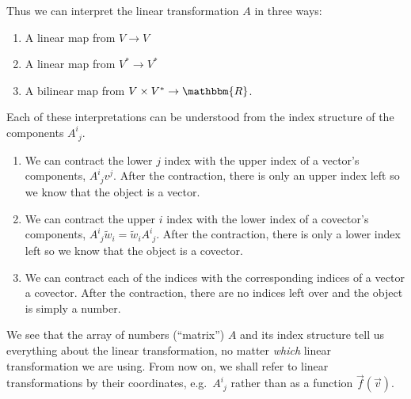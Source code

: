 \documentclass[
  11pt,
	colorful,
	raggedright,
]{tufte-style-thesis-flip}
\newcommand{\aij}[2]{^{#1}_{\phantom{#1}#2}}
\begin{document}
Thus we can interpret the linear transformation $A$ in three ways:
\begin{enumerate}
  \item A linear map from $V\to V$
  \item A linear map from $V^*\to V^*$
  \item A bilinear map from $V\times V^* \to \mathbbm{R}$.
\end{enumerate}
Each of these interpretations can be understood from the index structure of the components $A\aij{i}{j}$.
\begin{enumerate}
  \item We can contract the lower $j$ index with the upper index of a vector's components, $A\aij{i}{j}v^j$. After the contraction, there is only an upper index left so we know that the object is a vector. 
  \item We can contract the upper $i$ index with the lower index of a covector's components, $A\aij{i}{j}\tilde w_i= \tilde w_iA\aij{i}{j}$. After the contraction, there is only a lower index left so we know that the object is a covector. 
  \item We can contract each of the indices with the corresponding indices of a vector a covector. After the contraction, there are no indices left over and the object is simply a number.
\end{enumerate}

We see that the array of numbers (``matrix'') $A$ and its index structure tell us everything about the linear transformation, no matter \emph{which} linear transformation we are using. From now on, we shall refer to linear transformations by their coordinates, e.g.\ $A\aij{i}{j}$ rather than as a function $\vec{f}(\vec{v})$.
\end{document}
